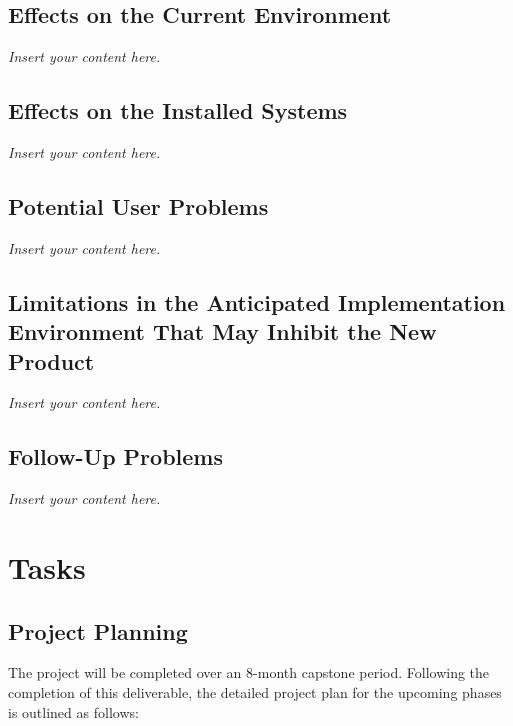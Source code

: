 \documentclass[12pt]{article}
\newcommand{\lips}{\textit{Insert your content here.}}
\begin{document}
\subsection{Effects on the Current Environment}
\lips
\subsection{Effects on the Installed Systems}
\lips
\subsection{Potential User Problems}
\lips
\subsection{Limitations in the Anticipated Implementation Environment That May
Inhibit the New Product}
\lips
\subsection{Follow-Up Problems}
\lips

\section{Tasks}
\subsection{Project Planning}
The project will be completed over an 8-month capstone period. Following the completion of this deliverable, the detailed project plan for the upcoming phases is outlined as follows:
\end{document}
